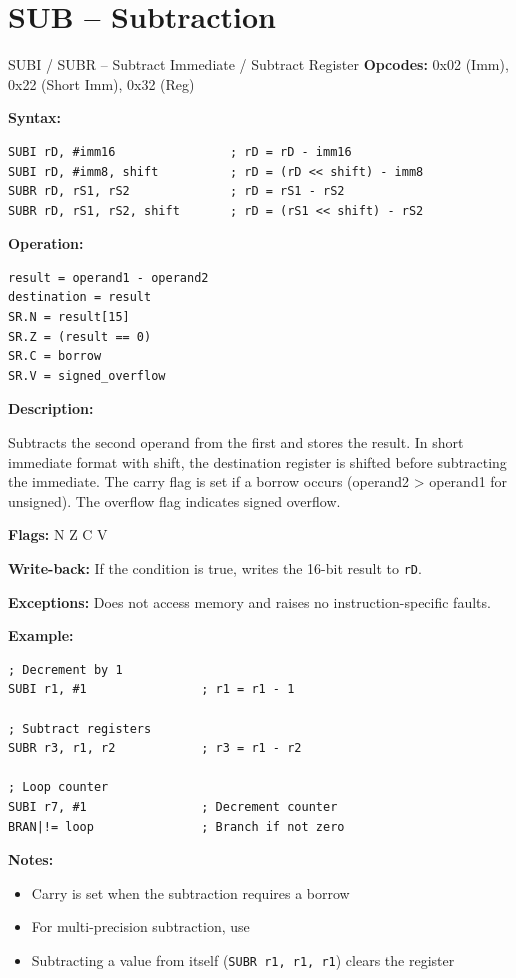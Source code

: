 \section{SUB -- Subtraction}

\begin{instructionbox}{SUBI / SUBR -- Subtract Immediate / Subtract Register}
	\textbf{Opcodes:} 0x02 (Imm), 0x22 (Short Imm), 0x32 (Reg)

	\textbf{Syntax:}
	\begin{lstlisting}
SUBI rD, #imm16                ; rD = rD - imm16
SUBI rD, #imm8, shift          ; rD = (rD << shift) - imm8
SUBR rD, rS1, rS2              ; rD = rS1 - rS2
SUBR rD, rS1, rS2, shift       ; rD = (rS1 << shift) - rS2
\end{lstlisting}

	\textbf{Operation:}
	\begin{verbatim}
result = operand1 - operand2
destination = result
SR.N = result[15]
SR.Z = (result == 0)
SR.C = borrow
SR.V = signed_overflow
\end{verbatim}

	\textbf{Description:}

	Subtracts the second operand from the first and stores the result. In short immediate format with shift, the
	destination register is shifted before subtracting the immediate. The carry flag is set if a borrow occurs
	(operand2 > operand1 for unsigned). The overflow flag indicates signed overflow.

	\textbf{Flags:} N Z C V

	\textbf{Write-back:} If the condition is true, writes the 16-bit result to \texttt{rD}.

	\textbf{Exceptions:} Does not access memory and raises no instruction-specific faults.

	\textbf{Example:}
	\begin{lstlisting}
; Decrement by 1
SUBI r1, #1                ; r1 = r1 - 1

; Subtract registers
SUBR r3, r1, r2            ; r3 = r1 - r2

; Loop counter
SUBI r7, #1                ; Decrement counter
BRAN|!= loop               ; Branch if not zero
\end{lstlisting}

	\textbf{Notes:}
	\begin{itemize}
		\item Carry is set when the subtraction requires a borrow
		\item For multi-precision subtraction, use 
		\item Subtracting a value from itself (\texttt{SUBR r1, r1, r1}) clears the register
	\end{itemize}
\end{instructionbox}

